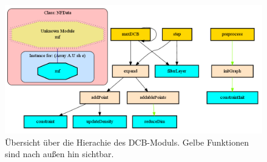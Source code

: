 \documentclass[a4paper]{scrartcl}
\begin{document}
\begin{figure}[h!]
 \centering
 \includegraphics[scale=0.5,keepaspectratio=true]{./img/DCB-Module.png}
 \caption{Übersicht über die Hierachie des DCB-Moduls. Gelbe Funktionen sind nach außen hin sichtbar.}
 \label{fig:DCB-Overview}
\end{figure}
\end{document}

